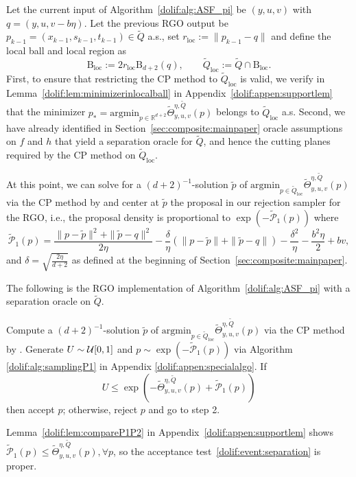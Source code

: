 \documentclass[11pt,letterpaper]{article}
\newcommand{\ball}{\mathrm{B}}
\newcommand{\R}{\mathbb{R}}
\newcommand{\local}{\mathrm{loc}}
\newcommand{\Q}{\widetilde{Q}}
\newcommand{\argmin}{\mathrm{argmin}  }
\newcommand{\brac}[1]{\left( #1\right)}
\begin{document}
Let the current input of Algorithm~\ref{dolif:alg:ASF_pi} be $(y,u,v)$ with $q=(y,u,v-b\eta)$. Let the previous RGO output be $ p_{k-1}=(x_{k-1},s_{k-1},t_{k-1})\in\Q$ a.s., set $r_{\local}:=\| p_{k-1}- q\|$ and define the local ball and local region as
\begin{equation}
\label{dolif:def:localball:appen}
    \ball_{\local}:=2r_{\local}\ball_{d+2}(q), \qquad  \Q_{\local}:=\Q\cap \ball_{\local}.
\end{equation}
First, to ensure that restricting the CP method to $\Q_{\local}$ is valid, we verify in Lemma~\ref{dolif:lem:minimizerinlocalball} in Appendix~\ref{dolif:appen:supportlem} that the minimizer $ p_*=\argmin_{ p\in \R^{d+2}}\widetilde{\Theta}^{\eta,\Q}_{y,u,v}( p)$
belongs to $\Q_{\local}$ a.s. Second, we have already identified in Section~\ref{sec:composite:mainpaper} oracle assumptions on $f$ and $h$ that yield a separation oracle for $\Q$, and hence the cutting planes required by the CP method on $\Q_{\mathrm{loc}}$. 



At this point, we can solve for a $(d+2)^{-1}$-solution $\tilde{ p}$ of $\argmin_{ p\in \Q_\local} \widetilde{\Theta}^{\eta,\Q}_{y,u,v}( p)$ via the CP method by \cite{jiang2020cuttingplane} and center at $\tilde{p}$ the proposal in our rejection sampler for the RGO, i.e., the proposal density is proportional to $\exp\brac{-\widetilde{\mathcal{P}}_1(p)}$ where 
\begin{equation}
\label{dolif:def:tildeP1:appen}
    \widetilde{\mathcal{P}}_1( p)
  = \frac{\| p-\tilde p\|^2 + \|\tilde p- q\|^2}{2\eta}
     - \frac{\delta}{\eta} \left(\| p-\tilde p\|+\|\tilde p- q\|\right) - \frac{\delta^2}{\eta} -\frac{b^2\eta}{2} + b v, 
\end{equation}
and $\delta = \sqrt{\frac{2\eta}{d+2}}$ as defined at the beginning of Section~\ref{sec:composite:mainpaper}. 

The following is the RGO implementation of Algorithm~\ref{dolif:alg:ASF_pi} with a separation oracle on $\Q$.
\begin{algorithm}[H]
	\caption{RGO implementation of Algorithm~\ref{dolif:alg:ASF_pi}}
	\label{dolif:RGO}
	\begin{algorithmic}[1]
		\State  Compute a $(d+2)^{-1}$-solution $\tilde{ p}$ of
        $\argmin_{ p\in \Q_\local} \widetilde{\Theta}^{\eta,\Q}_{y,u,v}( p)$ via the CP method by \cite{jiang2020cuttingplane}.
		\State Generate $U\sim {\cal U}[0,1]$ and $ p\sim \exp\brac{-\widetilde{\mathcal{P}}_1( p)}$ via Algorithm \ref{dolif:alg:samplingP1} in Appendix \ref{dolif:appen:specialalgo}. 
		\State  If
        \begin{equation}\label{dolif:event:separation}
			U \leq \exp\brac{-\widetilde{\Theta}_{y,u,v}^{\eta,\Q}( p)+\widetilde{\mathcal{P}}_1( p) }
		\end{equation}
		then accept $ p$; otherwise, reject $ p$ and go to step 2.
	\end{algorithmic}
\end{algorithm}
 Lemma~\ref{dolif:lem:compareP1P2} in Appendix~\ref{dolif:appen:supportlem} shows $\widetilde{\mathcal{P}}_1( p)\le \widetilde{\Theta}_{y,u,v}^{\eta,\Q}( p),\forall p$, so the acceptance test~\eqref{dolif:event:separation} is proper.
\end{document}
